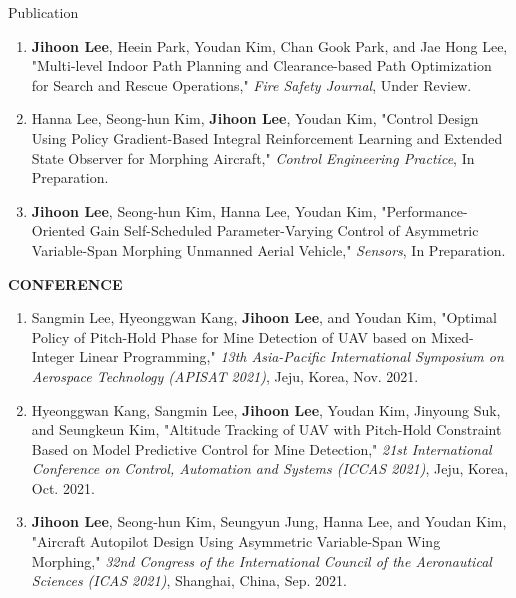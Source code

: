 \documentclass{resume}
\begin{document}
\begin{rSection}{Publication}
\begin{enumerate}
		\color{gray} 
		\item \textbf{\color{coolblack}Jihoon Lee}, Heein Park, Youdan Kim, Chan Gook Park, and Jae Hong Lee, "Multi-level Indoor Path Planning and Clearance-based Path Optimization for Search and Rescue Operations," \textit{Fire Safety Journal}, Under Review.
		
		\item Hanna Lee, Seong-hun Kim, \textbf{\color{coolblack}Jihoon Lee}, Youdan Kim, "Control Design Using Policy Gradient-Based Integral Reinforcement Learning and Extended State Observer for Morphing Aircraft," \textit{Control Engineering Practice}, In Preparation.
		
		\item \textbf{\color{coolblack}Jihoon Lee}, Seong-hun Kim, Hanna Lee, Youdan Kim, "Performance-Oriented Gain Self-Scheduled Parameter-Varying Control of Asymmetric Variable-Span Morphing Unmanned Aerial Vehicle," \textit{Sensors}, In Preparation.
	\end{enumerate}\renewcommand{\labelenumi}{\theenumi.}
	
	\textbf{CONFERENCE}
	\begin{enumerate}\renewcommand{\labelenumi}{[C\theenumi]}
		
		\item Sangmin Lee, Hyeonggwan Kang, \textbf{\color{coolblack}Jihoon Lee}, and Youdan Kim, "Optimal Policy of Pitch-Hold Phase for Mine Detection of UAV based on Mixed-Integer Linear Programming," \textit{13th Asia-Pacific International Symposium on Aerospace Technology (APISAT 2021)}, Jeju, Korea, Nov. 2021. 
				
		\item Hyeonggwan Kang, Sangmin Lee, \textbf{\color{coolblack}Jihoon Lee}, Youdan Kim, Jinyoung Suk, and Seungkeun Kim, "Altitude Tracking of UAV with Pitch-Hold Constraint Based on Model Predictive Control for Mine Detection," \textit{21st International Conference on Control, Automation and Systems (ICCAS 2021)}, Jeju, Korea, Oct. 2021. 
		
		\item \textbf{\color{coolblack}Jihoon Lee}, Seong-hun Kim, Seungyun Jung, Hanna Lee, and Youdan Kim, "Aircraft Autopilot Design Using Asymmetric Variable-Span Wing Morphing," \textit{32nd Congress of the International Council of the Aeronautical Sciences (ICAS 2021)}, Shanghai, China, Sep. 2021. 
		

\end{enumerate}
\end{rSection}
\end{document}
